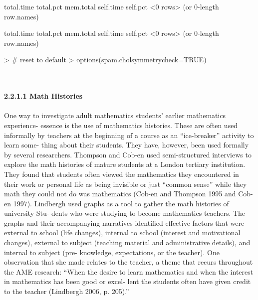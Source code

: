 \documentclass{article}
\begin{document}
\begin{Schunk}
\begin{Soutput}
[1] total.time total.pct  mem.total  self.time  self.pct  
<0 rows> (or 0-length row.names)
\end{Soutput}
\begin{Soutput}
[1] total.time total.pct  mem.total  self.time  self.pct  
<0 rows> (or 0-length row.names)
\end{Soutput}
\begin{Sinput}
> # reset to default
> options(spam.cholsymmetrycheck=TRUE)
\end{Sinput}
\end{Schunk}
\textit{\\\\}
\textbf{  2.2.1.1 Math Histories }
\textit{\\\\}
 One way to investigate adult mathematics students’ earlier mathematics experience-
   essence is the use of mathematics histories. These are often used informally by
 teachers at the beginning of a course as an “ice-breaker” activity to learn some-
   thing about their students. They have, however, been used formally by several
 researchers. Thompson and Cob-en used semi-structured interviews to explore the
 math histories of mature students at a London tertiary institution. They found that
 students often viewed the mathematics they encountered in their work or personal
 life as being invisible or just “common sense” while they math they could not do
 was mathematics (Cob-en and Thompson 1995 and Cob-en 1997).
 Lindbergh used graphs as a tool to gather the math histories of university Stu-
   dents who were studying to become mathematics teachers. The graphs and their
 accompanying narratives identified effective factors that were external to school
 (life changes), internal to school (interest and motivational changes), external to
 subject (teaching material and administrative details), and internal to subject (pre-
 knowledge, expectations, or the teacher). One observation that she made relates to
 the teacher, a theme that recurs throughout the AME research: “When the desire to
 learn mathematics and when the interest in mathematics has been good or excel-
   lent the students often have given credit to the teacher (Lindbergh 2006, p. 205).”
\end{document}
